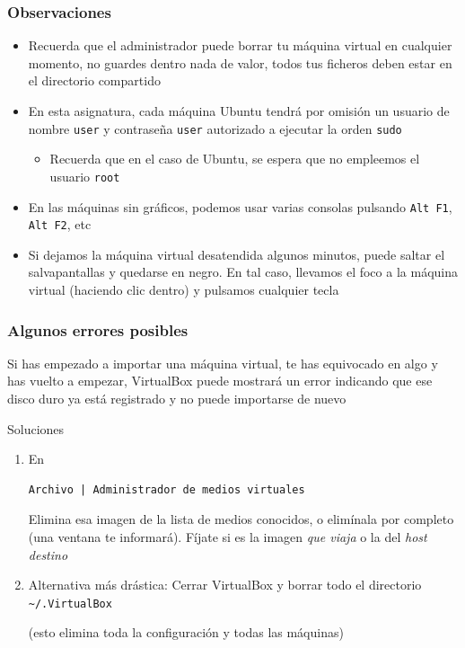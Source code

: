 \documentclass[ucs]{beamer}
\begin{document}
\begin{frame}[fragile]
\frametitle{Observaciones}
\begin{itemize}
\item
Recuerda que el administrador puede borrar tu máquina virtual en cualquier
momento, no guardes dentro nada de valor, todos tus ficheros deben estar
en el directorio compartido



\item
En esta asignatura, cada máquina Ubuntu tendrá por omisión un
usuario de nombre
\verb|user|
y contraseña
\verb|user|
autorizado a ejecutar la orden \verb|sudo|      
\begin{itemize}
\item
Recuerda que en el caso de Ubuntu, se espera que no empleemos el usuario \verb|root|
\end{itemize}

\item
En las máquinas sin gráficos, podemos usar varias consolas pulsando
 \verb|Alt F1|,
\verb|Alt F2|, etc
\item
Si dejamos la máquina virtual desatendida algunos minutos, puede 
saltar el salvapantallas y quedarse en negro. En tal caso, llevamos
el foco a la  máquina virtual (haciendo clic dentro) y pulsamos cualquier tecla
\end{itemize}

\end{frame}


\begin{frame}[fragile]
\frametitle{Algunos errores posibles}
Si has empezado a importar una máquina virtual, te has equivocado
en algo y has vuelto a empezar, VirtualBox puede mostrará un error
indicando que ese disco duro ya está registrado y no puede importarse de nuevo

Soluciones
\begin{enumerate}
\item
En
  \begin{footnotesize}
  \begin{verbatim}
Archivo | Administrador de medios virtuales
  \end{verbatim}
  \end{footnotesize}
Elimina esa imagen de la lista de medios conocidos, o elimínala por completo (una ventana
te informará). Fíjate si es la imagen \emph{que viaja} o la del \emph{host destino}

\item
Alternativa más drástica: Cerrar VirtualBox y borrar todo el directorio \verb|~/.VirtualBox|

(esto elimina toda la configuración y todas las máquinas)
\end{enumerate}

\end{frame}
\end{document}

